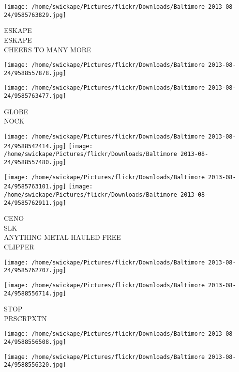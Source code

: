 \documentclass[10pt,letterpaper]{article}
\begin{document}
\vspace{0.25in}
\texttt{[image: /home/swickape/Pictures/flickr/Downloads/Baltimore 2013-08-24/9585763829.jpg]}

ESKAPE\\
ESKAPE\\
CHEERS TO MANY MORE\\
\pagebreak

\texttt{[image: /home/swickape/Pictures/flickr/Downloads/Baltimore 2013-08-24/9588557878.jpg]}

\vspace{0.25in}
\texttt{[image: /home/swickape/Pictures/flickr/Downloads/Baltimore 2013-08-24/9585763477.jpg]}

GLOBE\\
NOCK\\
\pagebreak

\texttt{[image: /home/swickape/Pictures/flickr/Downloads/Baltimore 2013-08-24/9588542414.jpg]}
\texttt{[image: /home/swickape/Pictures/flickr/Downloads/Baltimore 2013-08-24/9588557480.jpg]}

\texttt{[image: /home/swickape/Pictures/flickr/Downloads/Baltimore 2013-08-24/9585763101.jpg]}
\texttt{[image: /home/swickape/Pictures/flickr/Downloads/Baltimore 2013-08-24/9585762911.jpg]}

CENO\\
SLK\\
ANYTHING METAL HAULED FREE\\
CLIPPER\\
\pagebreak

\texttt{[image: /home/swickape/Pictures/flickr/Downloads/Baltimore 2013-08-24/9585762707.jpg]}

\vspace{0.25in}
\texttt{[image: /home/swickape/Pictures/flickr/Downloads/Baltimore 2013-08-24/9588556714.jpg]}

STOP\\
PRSCRPXTN\\
\pagebreak

\texttt{[image: /home/swickape/Pictures/flickr/Downloads/Baltimore 2013-08-24/9588556508.jpg]}

\vspace{0.25in}
\texttt{[image: /home/swickape/Pictures/flickr/Downloads/Baltimore 2013-08-24/9588556320.jpg]}
\end{document}

